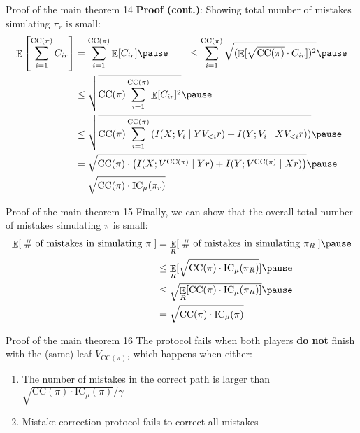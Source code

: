 \documentclass[10pt]{beamer}
\newcommand\E{\mathop{\mathbb{E}}}
\newcommand\CC{\textrm{CC}}
\newcommand\IC{\textrm{IC}}
\begin{document}
\begin{frame}{Proof of the main theorem 14}
\textbf{Proof (cont.)}: Showing total number of mistakes simulating $\pi_r$ is small:
\begin{align*}
    \E \left[ \sum_{i=1}^{\CC(\pi)} C_{ir} \right] &= \sum_{i=1}^{\CC(\pi)} \E[C_{ir}] \pause
    \qquad \leq \sum_{i=1}^{\CC(\pi)} \sqrt{(\E[\sqrt{\CC(\pi)} \cdot C_{ir}])^2} \pause
    \\ &\leq \sqrt{\CC(\pi) \sum_{i=1}^{\CC(\pi)} \E[C_{ir}]^2} \pause
    \\ &\leq \sqrt{\CC(\pi) \sum_{i=1}^{\CC(\pi)} \left( I(X; V_i \;|\; YV_{<i}r) + I(Y; V_i \;|\; XV_{<i}r) \right)} \pause
    \\ &= \sqrt{\CC(\pi) \cdot \left( I(X; V^{\CC(\pi)} \;|\; Yr) + I(Y; V^{\CC(\pi)} \;|\; Xr) \right)} \pause
    \\ &= \sqrt{\CC(\pi) \cdot \IC_\mu(\pi_r)}
\end{align*}
\end{frame}

\begin{frame}{Proof of the main theorem 15}
Finally, we can show that the overall total number of mistakes simulating $\pi$ is small:
\begin{align*}
    \E[\;\textrm{\# of mistakes in simulating $\pi$}\;]  &= \E_R[\;\textrm{\# of mistakes in simulating $\pi_R$}\;] \pause
    \\ &\leq \E_R[\sqrt{\CC(\pi) \cdot \IC_\mu(\pi_R)}] \pause
    \\ &\leq \sqrt{\E_R[\CC(\pi) \cdot \IC_\mu(\pi_R)]} \pause
    \\ &= \sqrt{\CC(\pi) \cdot \IC_\mu(\pi)} 
\end{align*}
\end{frame}

\begin{frame}{Proof of the main theorem 16}
The protocol fails when both players \textbf{do not} finish with the (same) leaf $V_{\CC(\pi)}$, which happens when either:
\begin{enumerate}
\pause
    \vskip 0.4cm
    \item The number of mistakes in the correct path is larger than $\sqrt{\CC(\pi) \cdot \IC_\mu(\pi)}/\gamma$
    \vskip 0.4cm
    \pause
    \item Mistake-correction protocol fails to correct all mistakes
\end{enumerate}
\end{frame}
\end{document}
